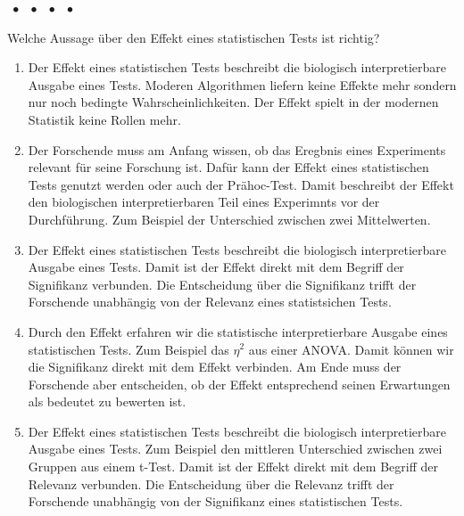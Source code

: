 \documentclass[a4paper, 9pt]{scrartcl}\usepackage[]{graphicx}\usepackage[]{xcolor}
\begin{document}
{%
\ifcollection
\begin{flushright}
\tiny\vspace{-2Ex}
\textbf{\examinhaltstart}
\exammodulemathstat $\;\bullet$
\exammodulestat $\;\bullet$
\exammodulestatbbv $\;\bullet$
\exammodulestatversuch $\;\bullet$
\exammodulebiostat
\vspace{-1Ex}
\end{flushright}
\fi




Welche Aussage über den Effekt eines statistischen Tests ist richtig?



\begin{enumerate}
\item [\textbf{A} \msquare] Der Effekt eines statistischen Tests beschreibt die biologisch interpretierbare Ausgabe eines Tests. Moderen Algorithmen liefern keine Effekte mehr sondern nur noch bedingte Wahrscheinlichkeiten. Der Effekt spielt in der modernen Statistik keine Rollen mehr.
\item [\textbf{B} \msquare] Der Forschende muss am Anfang wissen, ob das Eregbnis eines Experiments relevant für seine Forschung ist. Dafür kann der Effekt eines statistischen Tests genutzt werden oder auch der Prähoc-Test. Damit beschreibt der Effekt den biologischen interpretierbaren Teil eines Experimnts vor der Durchführung. Zum Beispiel der Unterschied zwischen zwei Mittelwerten.
\item [\textbf{C} \msquare] Der Effekt eines statistischen Tests beschreibt die biologisch interpretierbare Ausgabe eines Tests. Damit ist der Effekt direkt mit dem Begriff der Signifikanz verbunden. Die Entscheidung über die Signifikanz trifft der Forschende unabhängig von der Relevanz eines statistsichen Tests.
\item [\textbf{D} \msquare] Durch den Effekt erfahren wir die statistische interpretierbare Ausgabe eines statistischen Tests. Zum Beispiel das $\eta^2$ aus einer ANOVA. Damit können wir die Signifikanz direkt mit dem Effekt verbinden. Am Ende muss der Forschende aber entscheiden, ob der Effekt entsprechend seinen Erwartungen als bedeutet zu bewerten ist.
\item [\textbf{E} \msquare] Der Effekt eines statistischen Tests beschreibt die biologisch interpretierbare Ausgabe eines Tests. Zum Beispiel den mittleren Unterschied zwischen zwei Gruppen aus einem t-Test. Damit ist der Effekt direkt mit dem Begriff der Relevanz verbunden. Die Entscheidung über die Relevanz trifft der Forschende unabhängig von der Signifikanz eines statistischen Tests.
\end{enumerate} 

}
\end{document}
